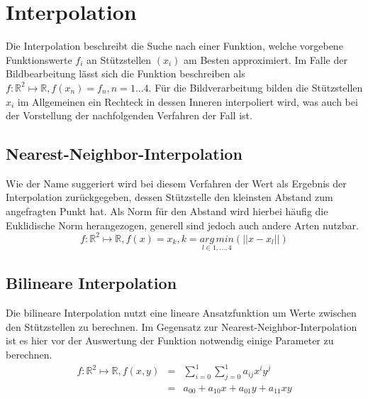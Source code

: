 \section{Interpolation}

Die Interpolation beschreibt die Suche nach einer Funktion, welche vorgebene Funktionswerte \( f_i \) an St\"utzstellen \( (x_i) \) am Besten approximiert. Im Falle der Bildbearbeitung l\"asst sich die Funktion beschreiben als 
\( f: \mathbb{R}^2\mapsto\mathbb{R}, f(x_n)=f_n, n=1...4 \). F\"ur die Bildverarbeitung bilden die St\"utzstellen \(x_i\) im Allgemeinen ein Rechteck in dessen Inneren interpoliert wird, was auch bei der Vorstellung der nachfolgenden Verfahren der Fall ist. 

\subsection*{Nearest-Neighbor-Interpolation}
Wie der Name suggeriert wird bei diesem Verfahren der Wert als Ergebnis der Interpolation zur\"uckgegeben, dessen St\"utzstelle den kleinsten Abstand zum angefragten Punkt hat. Als Norm f\"ur den Abstand wird hierbei h\"aufig die Euklidische Norm herangezogen, generell sind jedoch auch andere Arten nutzbar. 
\begin{equation*}
f: \mathbb{R}^2\mapsto\mathbb{R},f(x)=x_k,k=\underset{{l \in {1,..., 4}}}{arg\,min} (||x-x_l||)
\end{equation*}


\subsection*{Bilineare Interpolation}
Die bilineare Interpolation nutzt eine lineare Ansatzfunktion um Werte zwischen den St\"utzstellen zu berechnen. Im Gegensatz zur Nearest-Neighbor-Interpolation ist es hier vor der Auswertung der Funktion notwendig einige Parameter zu berechnen. 
\begin{eqnarray*}
 f: \mathbb{R}^2\mapsto\mathbb{R}, f(x, y)&=&\sum_{i=0}^1 \sum_{j=0}^1 a_{ij}x^iy^j \\
&=&a_{00}+a_{10}x+a_{01}y+a_{11}xy
\end{eqnarray*}


